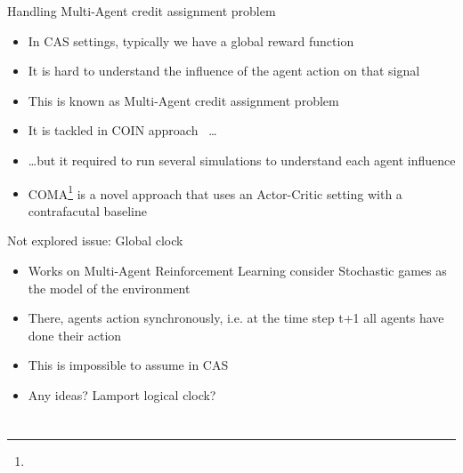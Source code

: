 \documentclass[presentation]{beamer}\mode<presentation>{\usetheme{AMSBolognaFC}}
\begin{document}
\begin{frame}{Handling Multi-Agent credit assignment problem}
	\begin{exampleblock}{}
		\begin{itemize}
			\item In CAS settings, typically we have a global reward function
			\item[{\color{red} \faThumbsDown}] It is hard to understand the influence of the agent action on that signal
			\item This is known as Multi-Agent credit assignment problem
			\item It is tackled in COIN approach~\parencite{wolpert1999introduction} \dots
			\item \dots but it required to run several simulations to understand each agent influence
			\item COMA\footnote[frame]{} is a novel approach that uses an Actor-Critic setting with a contrafacutal baseline 
		\end{itemize}
	\end{exampleblock}
\end{frame}

\begin{frame}{Not explored issue: Global clock}
	\begin{exampleblock}{}
		\begin{itemize}
			\item Works on Multi-Agent Reinforcement Learning consider Stochastic games as the model of the environment
			\item There, agents action synchronously, i.e. at the time step t+1 all agents have done their action
			\item This is impossible to assume in CAS
			\item Any ideas? Lamport logical clock? 
		\end{itemize}
	\end{exampleblock}
\end{frame}


\section*{}
\end{document}
